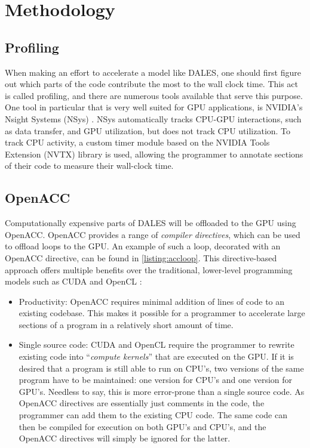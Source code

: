 \section{Methodology}

\subsection{Profiling}
When making an effort to accelerate a model like DALES, one should first figure out which parts of the code contribute the most to the wall clock time. This act is called profiling, and there are numerous tools available that serve this purpose. One tool in particular that is very well suited for GPU applications, is NVIDIA's Nsight Systems (NSys) \citep{nvidiaNVIDIANsightSystems}. NSys automatically tracks CPU-GPU interactions, such as data transfer, and GPU utilization, but does not track CPU utilization. To track CPU activity, a custom timer module based on the NVIDIA Tools Extension (NVTX) library is used, allowing the programmer to annotate sections of their code to measure their wall-clock time. 

\subsection{OpenACC}
Computationally expensive parts of DALES will be offloaded to the GPU using OpenACC. OpenACC provides a range of \emph{compiler directives}, which can be used to offload loops to the GPU. An example of such a loop, decorated with an OpenACC directive, can be found in \autoref{listing:accloop}. This directive-based approach offers multiple benefits over the traditional, lower-level programming models such as CUDA and OpenCL \citep{herdmanAcceleratingHydrocodesOpenACC2012}:

\begin{itemize}
    \item Productivity: OpenACC requires minimal addition of lines of code to an existing codebase. This makes it possible for a programmer to accelerate large sections of a program in a relatively short amount of time. 
    \item Single source code: CUDA and OpenCL require the programmer to rewrite existing code into ``\emph{compute kernels}'' that are executed on the GPU. If it is desired that a program is still able to run on CPU's, two versions of the same program have to be maintained: one version for CPU's and one version for GPU's. Needless to say, this is more error-prone than a single source code. As OpenACC directives are essentially just comments in the code, the programmer can add them to the existing CPU code. The same code can then be compiled for execution on both GPU's and CPU's, and the OpenACC directives will simply be ignored for the latter.
\end{itemize}

